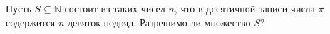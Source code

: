 Пусть $S \subseteq \mathbb{N}$ состоит из таких чисел $n$, что в десятичной записи числа $\pi$ содержится
$n$ девяток подряд. Разрешимо ли множество $S$?
